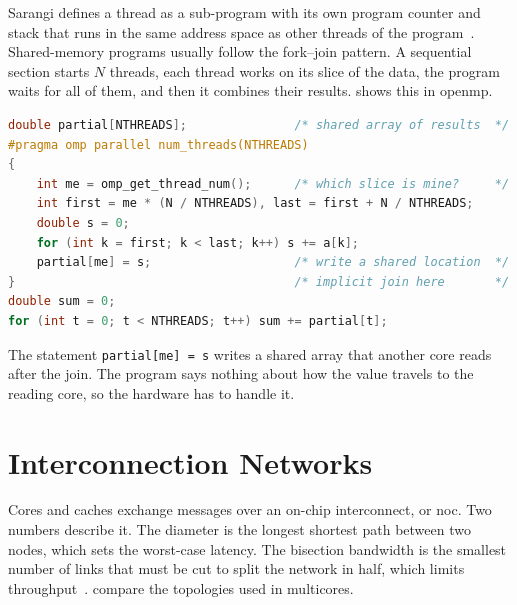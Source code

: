Sarangi defines a thread as a sub-program with its own program counter and stack
that runs in the same address space as other threads of the
program~\cite[\S12.2.2, Def.~120]{sarangi2025basic}. Shared-memory programs usually
follow the fork--join pattern. A sequential section starts $N$ threads, each thread
works on its slice of the data, the program waits for all of them, and then it
combines their results.  shows this in \gls{openmp}.

\begin{lstlisting}[language=C, caption={Fork--join in OpenMP: summing an array in parallel.}, label=lst:omp]
double partial[NTHREADS];               /* shared array of results  */
#pragma omp parallel num_threads(NTHREADS)
{
    int me = omp_get_thread_num();      /* which slice is mine?     */
    int first = me * (N / NTHREADS), last = first + N / NTHREADS;
    double s = 0;
    for (int k = first; k < last; k++) s += a[k];
    partial[me] = s;                    /* write a shared location  */
}                                       /* implicit join here       */
double sum = 0;
for (int t = 0; t < NTHREADS; t++) sum += partial[t];
\end{lstlisting}

The statement \texttt{partial[me] = s} writes a shared array that another core
reads after the join. The program says nothing about how the value travels to the
reading core, so the hardware has to handle it.

\section{Interconnection Networks}
\label{sec:par-noc}
%

Cores and caches exchange messages over an on-chip interconnect, or
\gls{noc}. Two numbers describe it. The diameter is the
longest shortest path between two nodes, which sets the worst-case latency. The
bisection bandwidth is the smallest number of links that must be cut to split the
network in half, which limits throughput~\cite[\S12.6.2]{sarangi2025basic}.
 compare the topologies used in multicores.

